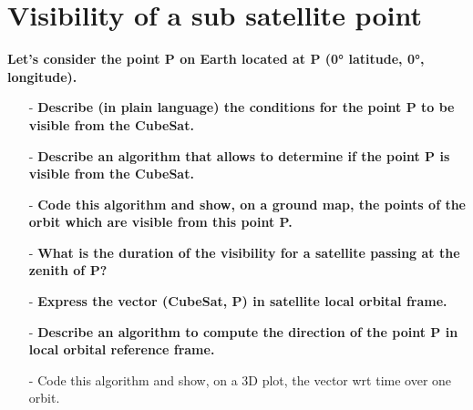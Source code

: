 \section{Visibility of a sub satellite point} 

 
\textbf{Let’s consider the point P on Earth located at P (0° latitude, 0°, longitude). }
\begin{itemize}
    \item[-] \textbf{Describe (in plain language) the conditions for the point P to be visible from the CubeSat.}
    \item[-] \textbf{Describe an algorithm that allows to determine if the point P is visible from the CubeSat.}
    \item[-] \textbf{Code this algorithm and show, on a ground map, the points of the orbit which are visible from this point P.}
    \item[-] \textbf{What is the duration of the visibility for a satellite passing at the zenith of P?}
\end{itemize}

 
\vspace{0.5cm}
\begin{itemize}
    \item[-] \textbf{Express the vector (CubeSat, P) in satellite local orbital frame.}
    \item[-] \textbf{Describe an algorithm to compute the direction of the point P in local orbital reference frame.}
    \item[-] Code this algorithm and show, on a 3D plot, the vector wrt time over one orbit.
\end{itemize}